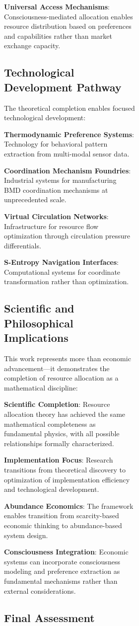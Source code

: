\documentclass[12pt,a4paper]{article}
\begin{document}
\begin{figure}[H]
\begin{figure}[H]
\begin{figure}[H]
\textbf{Universal Access Mechanisms}: Consciousness-mediated allocation enables resource distribution based on preferences and capabilities rather than market exchange capacity.

\subsection{Technological Development Pathway}

The theoretical completion enables focused technological development:

\textbf{Thermodynamic Preference Systems}: Technology for behavioral pattern extraction from multi-modal sensor data.

\textbf{Coordination Mechanism Foundries}: Industrial systems for manufacturing BMD coordination mechanisms at unprecedented scale.

\textbf{Virtual Circulation Networks}: Infrastructure for resource flow optimization through circulation pressure differentials.

\textbf{S-Entropy Navigation Interfaces}: Computational systems for coordinate transformation rather than optimization.

\subsection{Scientific and Philosophical Implications}

This work represents more than economic advancement—it demonstrates the completion of resource allocation as a mathematical discipline:

\textbf{Scientific Completion}: Resource allocation theory has achieved the same mathematical completeness as fundamental physics, with all possible relationships formally characterized.

\textbf{Implementation Focus}: Research transitions from theoretical discovery to optimization of implementation efficiency and technological development.

\textbf{Abundance Economics}: The framework enables transition from scarcity-based economic thinking to abundance-based system design.

\textbf{Consciousness Integration}: Economic systems can incorporate consciousness modeling and preference extraction as fundamental mechanisms rather than external considerations.

\subsection{Final Assessment}


\end{figure}
\end{figure}
\end{figure}
\end{document}
